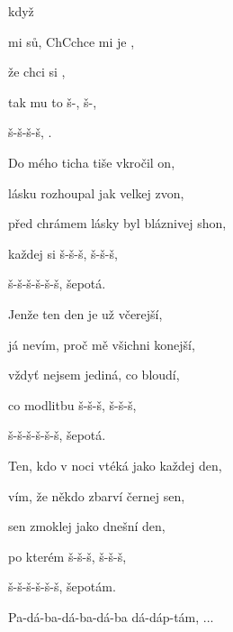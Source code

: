 

       

\zs
{}  když  

 mi sů, Ch{C}{chce} mi je ,

 že  chci  si ,

tak mu to š-, š-,

š-š-š-š, .
\ks

\zs
Do mého ticha tiše vkročil on,

lásku rozhoupal jak velkej zvon,

před chrámem lásky byl bláznivej shon,

každej si š-š-š, š-š-š,

š-š-š-š-š-š, šepotá.
\ks

\zs
Jenže ten den je už včerejší,

já nevím, proč mě všichni konejší,

vždyť nejsem jediná, co bloudí,

co modlitbu š-š-š, š-š-š,

š-š-š-š-š-š, šepotá.
\ks

\zs
Ten, kdo v noci vtéká jako každej den,

vím, že někdo zbarví černej sen,

sen zmoklej jako dnešní den,

po kterém š-š-š, š-š-š,

š-š-š-š-š-š, šepotám.
\ks

\zs
Pa-dá-ba-dá-ba-dá-ba dá-dáp-tám, ...
\ks

\kp





